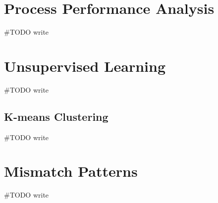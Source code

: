 \section{Process Performance Analysis}
\label{sec:process-performance-analysis}
#TODO write

\section{Unsupervised Learning}
\label{sec:unsupervised-learning}
#TODO write

\subsection{K-means Clustering}
\label{sec:kmeans-clustering}
#TODO write

\section{Mismatch Patterns}
\label{sec:mismatch-patterns}
#TODO write